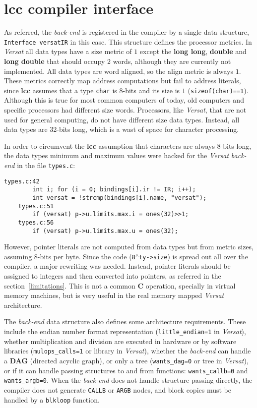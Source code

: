 \section{{\bf lcc} compiler interface}
As referred, the {\it back-end} is registered in the
compiler by a single data structure,
{\tt Interface versatIR} in this case.
This structure defines the processor metrics.
In {\it Versat} all data types have a size
metric of $1$ except the {\bf long long},
{\bf double} and {\bf long double} that
should occupy $2$ words, although they
are currently not implemented.
All data types are word aligned, so the align
metric is always $1$.
These metrics correctly map address computations
but fail to address literals, since {\bf lcc}
assumes that a type {\tt char} is 8-bits and
its size is $1$ ({\tt sizeof(char)==1}).
Although this is true for most common computers
of today, old computers and specific processors
had different size words.
Processors, like {\it Versat}, that are not
used for general computing, do not have
different size data types.
Instead, all data types are 32-bits long,
which is a wast of space for character processing.

In order to circumvent the {\bf lcc} assumption
that characters are always 8-bits long, the
data types minimum and maximum values were
hacked for the {\it Versat} {\it back-end} in
the file {\tt types.c}:
\begin{Verbatim}[baselinestretch=1.2]
    types.c:42
        int i; for (i = 0; bindings[i].ir != IR; i++);
        int versat = !strcmp(bindings[i].name, "versat");
    types.c:51
        if (versat) p->u.limits.max.i = ones(32)>>1;
    types.c:56
        if (versat) p->u.limits.max.u = ones(32);
\end{Verbatim}

However, pointer literals are not computed from
data types but from metric sizes, assuming
8-bits per byte.
Since the code ({\tt 8}$^{\wedge}${\tt ty->size})
is spread out all over the compiler, a major
rewriting was needed.
Instead, pointer literals should be assigned to
integers and then converted into pointers, as
referred in the section~\ref{limitations}.
This is not a common {\bf C} operation, specially
in virtual memory machines, but is very useful in
the real memory mapped {\it Versat} architecture.

The {\it back-end} data structure also defines some
architecture requirements.
These include the endian number format representation
({\tt little\_endian=1} in {\it Versat}),
whether multiplication and division are executed
in hardware or by software libraries
({\tt mulops\_calls=1} or library in {\it Versat}),
whether the {\it back-end} can handle a {\bf DAG}
(directed acyclic graph), or only a tree
({\tt wants\_dag=0} or tree in {\it Versat}), or if
it can handle passing structures to and from
functions: {\tt wants\_callb=0} and {\tt wants\_argb=0}.
When the {\it back-end} does not handle structure
passing directly, the compiler
does not generate {\tt CALLB} or {\tt ARGB}
nodes, and block copies
must be handled by a {\tt blkloop} function.

